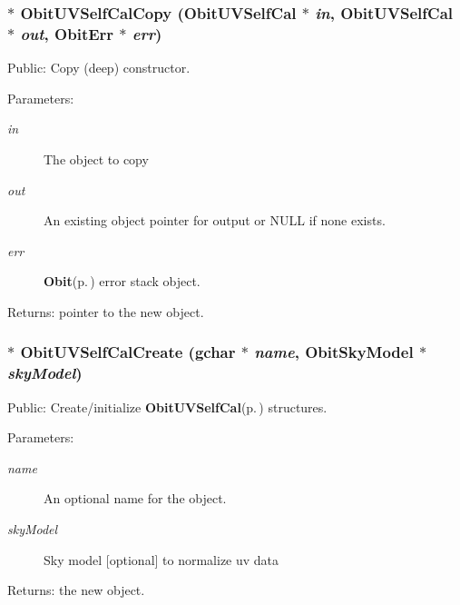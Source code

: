 \subsubsection{$\ast$ Obit\-UVSelf\-Cal\-Copy ({\bf Obit\-UVSelf\-Cal} $\ast$ {\em in}, {\bf Obit\-UVSelf\-Cal} $\ast$ {\em out}, {\bf Obit\-Err} $\ast$ {\em err})}\label{ObitUVSelfCal_8c_a8}


Public: Copy (deep) constructor. 

\begin{Desc}
\item[Parameters:]
\begin{description}
\item[{\em in}]The object to copy \item[{\em out}]An existing object pointer for output or NULL if none exists. \item[{\em err}]{\bf Obit}{\rm (p.\,\pageref{structObit})} error stack object. \end{description}
\end{Desc}
\begin{Desc}
\item[Returns:]pointer to the new object. \end{Desc}
\subsubsection{$\ast$ Obit\-UVSelf\-Cal\-Create (gchar $\ast$ {\em name}, {\bf Obit\-Sky\-Model} $\ast$ {\em sky\-Model})}\label{ObitUVSelfCal_8c_a10}


Public: Create/initialize {\bf Obit\-UVSelf\-Cal}{\rm (p.\,\pageref{structObitUVSelfCal})} structures. 

\begin{Desc}
\item[Parameters:]
\begin{description}
\item[{\em name}]An optional name for the object. \item[{\em sky\-Model}]Sky model [optional] to normalize uv data \end{description}
\end{Desc}
\begin{Desc}
\item[Returns:]the new object. \end{Desc}
